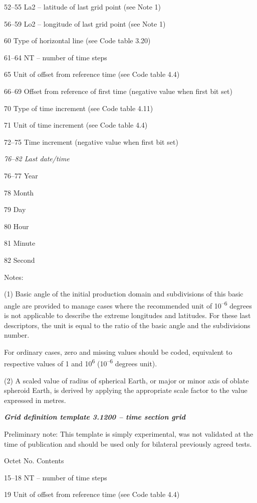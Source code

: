 52--55 La2 -- latitude of last grid point (see Note 1)

56--59 Lo2 -- longitude of last grid point (see Note 1)

60 Type of horizontal line (see Code table 3.20)

61--64 NT -- number of time steps

65 Unit of offset from reference time (see Code table 4.4)

66--69 Offset from reference of first time (negative value when first bit set)

70 Type of time increment (see Code table 4.11)

71 Unit of time increment (see Code table 4.4)

72--75 Time increment (negative value when first bit set)

\emph{76--82 Last date/time}

76--77 Year

78 Month

79 Day

80 Hour

81 Minute

82 Second

Notes:

(1) Basic angle of the initial production domain and subdivisions of this basic angle are provided to manage cases where the recommended unit of 10\textsuperscript{--6} degrees is not applicable to describe the extreme longitudes and latitudes. For these last descriptors, the unit is equal to the ratio of the basic angle and the subdivisions number.

For ordinary cases, zero and missing values should be coded, equivalent to respective values of 1 and 10\textsuperscript{6} (10\textsuperscript{--6} degrees unit).

(2) A scaled value of radius of spherical Earth, or major or minor axis of oblate spheroid Earth, is derived by applying the appropriate scale factor to the value expressed in metres.

\emph{\textbf{Grid definition template 3.1200 -- time section grid}}

Preliminary note: This template is simply experimental, was not validated at the time of publication and should be used only for bilateral previously agreed tests.

Octet No. Contents

15--18 NT -- number of time steps

19 Unit of offset from reference time (see Code table 4.4)


